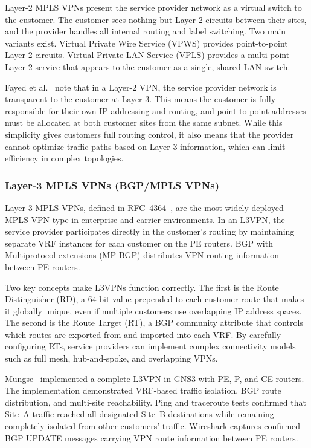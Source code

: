 \documentclass[conference]{IEEEtran}
\begin{document}
Layer-2 MPLS VPNs present the service provider network as a virtual
switch to the customer. The customer sees nothing but Layer-2
circuits between their sites, and the provider handles all internal
routing and label switching. Two main variants exist. Virtual
Private Wire Service (VPWS) provides point-to-point Layer-2
circuits. Virtual Private LAN Service (VPLS) provides a
multi-point Layer-2 service that appears to the customer as a
single, shared LAN switch.

Fayed et al.~\cite{fayed2024} note that in a Layer-2 VPN, the
service provider network is transparent to the customer at Layer-3.
This means the customer is fully responsible for their own IP
addressing and routing, and point-to-point addresses must be
allocated at both customer sites from the same subnet. While this
simplicity gives customers full routing control, it also means that
the provider cannot optimize traffic paths based on Layer-3
information, which can limit efficiency in complex topologies.

\subsubsection{Layer-3 MPLS VPNs (BGP/MPLS VPNs)}

Layer-3 MPLS VPNs, defined in RFC~4364~\cite{rfc4364}, are the
most widely deployed MPLS VPN type in enterprise and carrier
environments. In an L3VPN, the service provider participates
directly in the customer's routing by maintaining separate VRF
instances for each customer on the PE routers. BGP with
Multiprotocol extensions (MP-BGP) distributes VPN routing
information between PE routers.

Two key concepts make L3VPNs function correctly. The first is the
Route Distinguisher (RD), a 64-bit value prepended to each customer
route that makes it globally unique, even if multiple customers use
overlapping IP address spaces. The second is the Route Target (RT),
a BGP community attribute that controls which routes are exported
from and imported into each VRF. By carefully configuring RTs,
service providers can implement complex connectivity models such as
full mesh, hub-and-spoke, and overlapping VPNs.

Mungse~\cite{mungse2023} implemented a complete L3VPN in GNS3 with
PE, P, and CE routers. The implementation demonstrated VRF-based
traffic isolation, BGP route distribution, and multi-site
reachability. Ping and traceroute tests confirmed that Site~A
traffic reached all designated Site~B destinations while remaining
completely isolated from other customers' traffic. Wireshark
captures confirmed BGP UPDATE messages carrying VPN route
information between PE routers.
\end{document}
